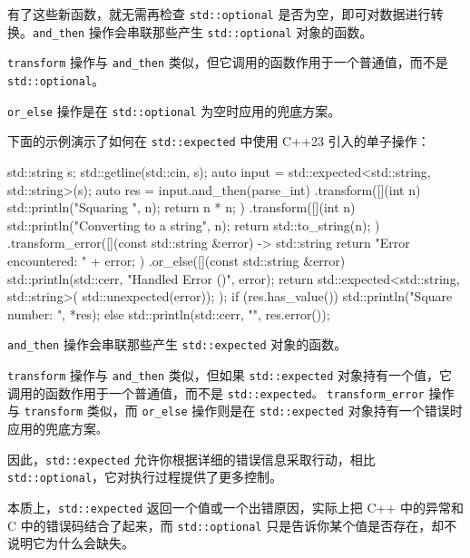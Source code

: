 \label{idx:476}
有了这些新函数，就无需再检查 \texttt{std::\allowbreak{}optional} 是否为空，即可对数据进行转换。\texttt{and\_then} 操作会串联那些产生 \texttt{std::\allowbreak{}optional} 对象的函数。

\texttt{transform} 操作与 \texttt{and\_then} 类似，但它调用的函数作用于一个普通值，而不是 \texttt{std::\allowbreak{}optional}。

\texttt{or\_else} 操作是在 \texttt{std::\allowbreak{}optional} 为空时应用的兜底方案。

下面的示例演示了如何在 \texttt{std::\allowbreak{}expected} 中使用 C++23 引入的单子操作：

\begin{codebox}[cpp]
std::string s;
std::getline(std::cin, s);
auto input = std::expected<std::string, std::string>(s);
auto res =
    input.and_then(parse_int)
         .transform([](int n) {
             std::println("Squaring {}", n);
             return n * n;
         })
         .transform([](int n) {
             std::println("Converting {} to a string", n);
             return std::to_string(n);
         })
         .transform_error([](const std::string &error) -> std::string {
             return "Error encountered: " + error;
         })
         .or_else([](const std::string &error) {
             std::println(std::cerr, "Handled Error ({})", error);
             return std::expected<std::string, std::string>(
                 std::unexpected(error));
         });
if (res.has_value()) {
    std::println("Square number: {}", *res);
} else {
    std::println(std::cerr, "{}", res.error());
}
\end{codebox}

\texttt{and\_then} 操作会串联那些产生 \texttt{std::\allowbreak{}expected} 对象的函数。

\texttt{transform} 操作与 \texttt{and\_then} 类似，但如果 \texttt{std::\allowbreak{}expected} 对象持有一个值，它调用的函数作用于一个普通值，而不是 \texttt{std::\allowbreak{}expected}\texttt{。} \texttt{transform\_\allowbreak{}error} 操作与 \texttt{transform} 类似，而 \texttt{or\_else} 操作则是在 \texttt{std::\allowbreak{}expected} 对象持有一个错误时应用的兜底方案\texttt{。}

因此，\texttt{std::\allowbreak{}expected} 允许你根据详细的错误信息采取行动，相比 \texttt{std::\allowbreak{}optional}，它对执行过程提供了更多控制。

\label{idx:477}
本质上，\texttt{std::\allowbreak{}expected} 返回一个值或一个出错原因，实际上把 C++ 中的异常和 C 中的错误码结合了起来，而 \texttt{std::\allowbreak{}optional} 只是告诉你某个值是否存在，却不说明它为什么会缺失。

